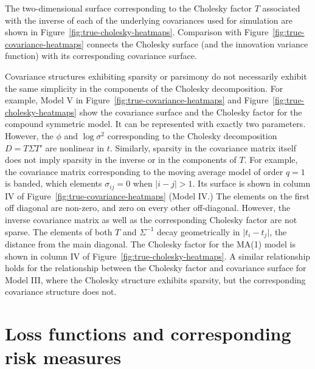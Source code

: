 \documentclass[12pt]{article}
\theoremstyle{definition}
\begin{document}
\bigskip



\bigskip

The two-dimensional surface corresponding to the Cholesky factor $T$ associated with the inverse of each of the underlying covariances used for simulation are shown in Figure~\ref{fig:true-cholesky-heatmaps}. Comparison with Figure~\ref{fig:true-covariance-heatmaps}  connects the Cholesky surface (and the innovation variance function) with its corresponding covariance surface.



Covariance structures exhibiting sparsity or parsimony do not necessarily exhibit the same simplicity in the components of the Cholesky decomposition.  For example, Model V in Figure~\ref{fig:true-covariance-heatmaps} and Figure~\ref{fig:true-cholesky-heatmaps} show the covariance surface and the Cholesky factor for the compound symmetric model. It can be represented with exactly two parameters. However, the $\phi$ and $\log \sigma^2$ corresponding to the Cholesky decomposition $D = T \Sigma T'$ are nonlinear in $t$. Similarly, sparsity in the covariance matrix itself does not imply sparsity in the inverse or in the components of $T$. For example, the covariance matrix corresponding to the moving average model of order $q=1$  is banded, which elements $\sigma_{ij} = 0$ when $\vert i-j \vert > 1$.  Its surface is shown in column IV of Figure~\ref{fig:true-covariance-heatmaps} (Model IV.) The elements on the first off diagonal are non-zero, and zero on every other off-diagonal. However, the inverse covariance matrix as well as the corresponding Cholesky factor are not sparse. The elements of both $T$ and $\Sigma^{-1}$ decay geometrically in $\vert t_i - t_j \vert$, the distance from the main diagonal.  The Cholesky factor for the MA(1) model is shown in column IV of  Figure~\ref{fig:true-cholesky-heatmaps}. A similar relationship holds for the relationship between the Cholesky factor and covariance surface for Model III, where the Cholesky structure exhibits sparsity, but the corresponding covariance structure does not. 


\bigskip

\section{Loss functions and corresponding risk measures}

\end{document}
